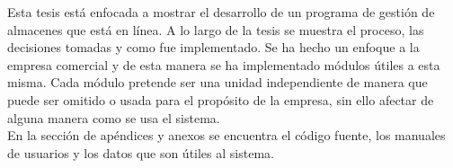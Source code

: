 

\begin{abstracts}        %

Esta tesis está enfocada a mostrar el desarrollo de un programa de gestión de almacenes que está en línea. A lo largo de la tesis se muestra el proceso, las decisiones tomadas y como fue implementado. Se ha hecho un enfoque a la empresa comercial y de esta manera se ha implementado módulos útiles a esta misma. Cada módulo pretende ser una unidad independiente de manera que puede ser omitido o usada para el propósito de la empresa, sin ello afectar de alguna manera como se usa el sistema.\\

En la sección de apéndices y anexos se encuentra el código fuente, los manuales de usuarios y los datos que son útiles al sistema.

\end{abstracts}


